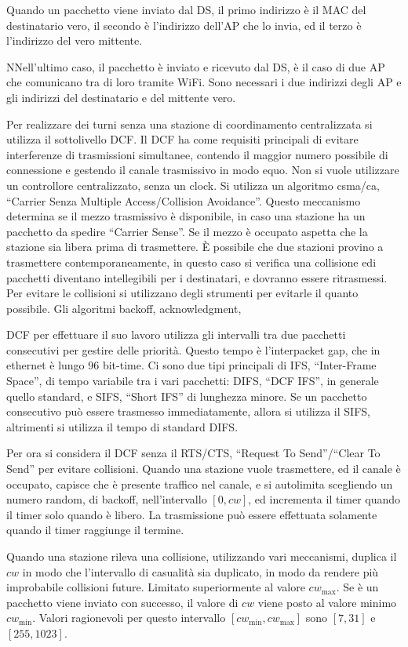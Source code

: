 \documentclass{article}
\numberwithin{equation}{subsection}
\begin{document}
Quando un pacchetto viene inviato dal DS, il primo indirizzo è il MAC del destinatario vero, il secondo è l'indirizzo dell'AP che lo invia, ed il terzo è l'indirizzo del 
vero mittente. 

NNell'ultimo caso, il pacchetto è inviato e ricevuto dal DS, è il caso di due AP che comunicano tra di loro tramite WiFi. Sono necessari i due indirizzi degli AP e gli 
indirizzi del destinatario e del mittente vero. 


Per realizzare dei turni senza una stazione di coordinamento centralizzata si utilizza il sottolivello DCF. Il DCF ha come requisiti principali di evitare interferenze di 
trasmissioni simultanee, contendo il maggior numero possibile di connessione e gestendo il canale trasmissivo in modo equo. Non si vuole utilizzare un controllore 
centralizzato, senza un clock. 
Si utilizza un algoritmo csma/ca, ``Carrier Senza Multiple Access/Collision Avoidance''. Questo meccanismo determina se il mezzo trasmissivo è disponibile, in caso 
una stazione ha un pacchetto da spedire ``Carrier Sense''. Se il mezzo è occupato aspetta che la stazione sia libera prima di trasmettere. 
\`{E} possibile che due stazioni provino a trasmettere contemporaneamente, in questo caso si verifica una collisione edi  pacchetti diventano intellegibili per 
i destinatari, e dovranno essere ritrasmessi. Per evitare le collisioni si utilizzano degli strumenti per evitarle il quanto possibile. Gli algoritmi backoff, 
acknowledgment, 

DCF per effettuare il suo lavoro utilizza gli intervalli tra due pacchetti consecutivi per gestire delle priorità. Questo tempo è l'interpacket gap, che in ethernet 
è lungo 96 bit-time. Ci sono due tipi principali di IFS, ``Inter-Frame Space'', di tempo variabile tra i vari pacchetti: DIFS, ``DCF IFS'', in generale quello standard, e 
SIFS, ``Short IFS'' di lunghezza minore. 
Se un pacchetto consecutivo può essere trasmesso immediatamente, allora si utilizza il SIFS, altrimenti si utilizza il tempo di standard DIFS. 


Per ora si considera il DCF senza il RTS/CTS, ``Request To Send''/``Clear To Send'' per evitare collisioni.  
Quando una stazione vuole trasmettere, ed il canale è occupato, capisce che è presente traffico nel canale, e si autolimita scegliendo un numero random, di backoff, 
nell'intervallo $[0,cw]$, ed incrementa il timer quando il timer solo quando è libero. La trasmissione può essere effettuata solamente quando il timer raggiunge il termine. 

Quando una stazione rileva una collisione, utilizzando vari meccanismi, duplica il $cw$ in modo che l'intervallo di casualità sia duplicato, in modo da rendere più 
improbabile collisioni future. Limitato superiormente al valore $cw_{\max}$. Se è un pacchetto viene inviato con successo, il valore di $cw$ viene posto al 
valore minimo $cw_{\min}$. 
Valori ragionevoli per questo intervallo $[cw_{\min},cw_{\max}]$ sono $[7,31]$ e $[255, 1023]$. 
\end{document}
